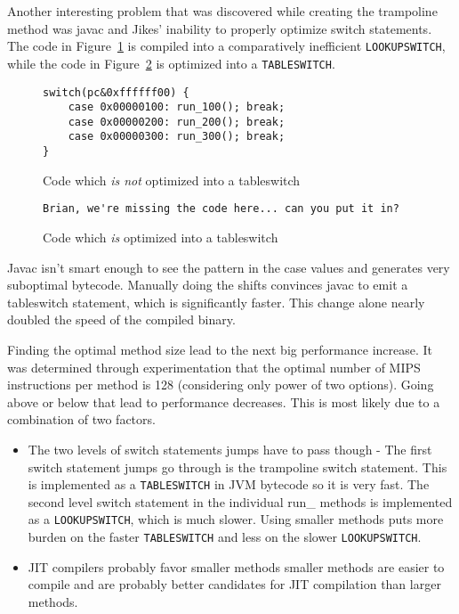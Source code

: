 \documentclass{acmconf}
\begin{document}
Another interesting problem that was discovered while creating the
trampoline method was javac and Jikes' inability to properly optimize
switch statements.  The code in Figure~\ref{lookupswitch} is compiled
into a comparatively inefficient {\tt LOOKUPSWITCH}, while the code in
Figure~\ref{tableswitch} is optimized into a {\tt TABLESWITCH}.

\begin{figure}
{\footnotesize\begin{verbatim}
switch(pc&0xffffff00) {
    case 0x00000100: run_100(); break;
    case 0x00000200: run_200(); break;
    case 0x00000300: run_300(); break;
}
\end{verbatim}}
\caption{\label{lookupswitch} Code which {\it is not} optimized into a tableswitch}
\end{figure}

\begin{figure}
{\footnotesize\begin{verbatim}
Brian, we're missing the code here... can you put it in?
\end{verbatim}}
\caption{\label{tableswitch} Code which {\it is} optimized into a tableswitch}
\end{figure}

Javac isn't smart enough to see the pattern in the case values and
generates very suboptimal bytecode. Manually doing the shifts
convinces javac to emit a tableswitch statement, which is
significantly faster. This change alone nearly doubled the speed of
the compiled binary.

Finding the optimal method size lead to the next big performance
increase.  It was determined through experimentation that the optimal
number of MIPS instructions per method is 128 (considering only power
of two options). Going above or below that lead to performance
decreases. This is most likely due to a combination of two factors.

\begin{itemize}

\item The two levels of switch statements jumps have to pass though -
      The first switch statement jumps go through is the trampoline
      switch statement. This is implemented as a {\tt TABLESWITCH} in JVM
      bytecode so it is very fast. The second level switch statement
      in the individual run\_ methods is implemented as a
      {\tt LOOKUPSWITCH}, which is much slower. Using smaller methods puts
      more burden on the faster {\tt TABLESWITCH} and less on the slower
      {\tt LOOKUPSWITCH}.

\item JIT compilers probably favor smaller methods smaller methods are
      easier to compile and are probably better candidates for JIT
      compilation than larger methods.

\end{itemize}
\end{document}
